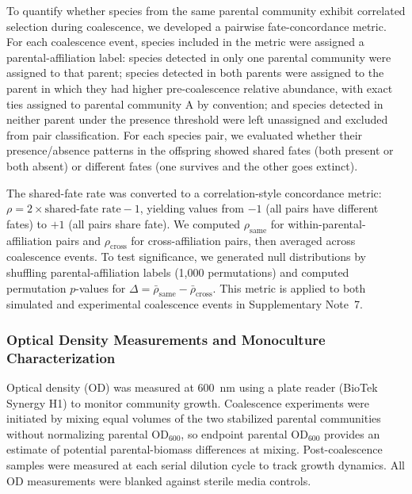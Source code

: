 To quantify whether species from the same parental community exhibit correlated selection during coalescence, we developed a pairwise fate-concordance metric. For each coalescence event, species included in the metric were assigned a parental-affiliation label: species detected in only one parental community were assigned to that parent; species detected in both parents were assigned to the parent in which they had higher pre-coalescence relative abundance, with exact ties assigned to parental community A by convention; and species detected in neither parent under the presence threshold were left unassigned and excluded from pair classification. For each species pair, we evaluated whether their presence/absence patterns in the offspring showed shared fates (both present or both absent) or different fates (one survives and the other goes extinct).

The shared-fate rate was converted to a correlation-style concordance metric: $\rho = 2 \times \text{shared-fate rate} - 1$, yielding values from $-1$ (all pairs have different fates) to $+1$ (all pairs share fate). We computed $\rho_{\text{same}}$ for within-parental-affiliation pairs and $\rho_{\text{cross}}$ for cross-affiliation pairs, then averaged across coalescence events. To test significance, we generated null distributions by shuffling parental-affiliation labels (1,000 permutations) and computed permutation $p$-values for $\Delta = \bar{\rho}_{\text{same}} - \bar{\rho}_{\text{cross}}$. This metric is applied to both simulated and experimental coalescence events in Supplementary Note~7.


\subsubsection*{Optical Density Measurements and Monoculture Characterization}
\label{sec:suppl:od}

Optical density (OD) was measured at 600~nm using a plate reader (BioTek Synergy H1) to monitor community growth. Coalescence experiments were initiated by mixing equal volumes of the two stabilized parental communities without normalizing parental OD$_{600}$, so endpoint parental OD$_{600}$ provides an estimate of potential parental-biomass differences at mixing. Post-coalescence samples were measured at each serial dilution cycle to track growth dynamics. All OD measurements were blanked against sterile media controls.

